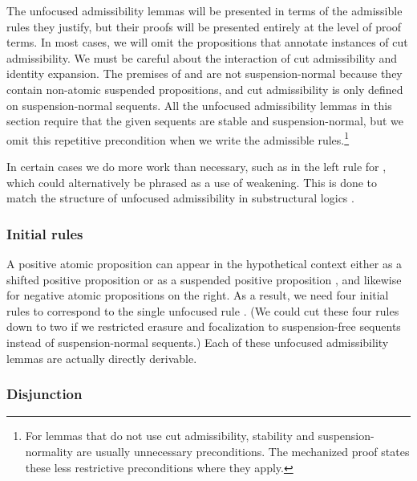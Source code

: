 \documentclass[acmtocl]{robtrans}\pdfoutput=1
\begin{document}
The unfocused admissibility lemmas will be presented in terms of the
admissible rules they justify, but their proofs will be presented
entirely at the level of proof terms. In most cases, we will omit the
propositions that annotate instances of cut admissibility.  We must be
careful about the interaction of cut admissibility and identity
expansion. The premises of  and  are
not suspension-normal because they contain non-atomic suspended
propositions, and cut admissibility is only defined on
suspension-normal sequents. All the unfocused admissibility lemmas in
this section require that the given sequents are stable and
suspension-normal, but we omit this repetitive precondition when we
write the admissible rules.\footnote{For lemmas that do not use cut
  admissibility, stability and suspension-normality are usually
  unnecessary preconditions. The mechanized proof states these less
  restrictive preconditions where they apply.}

\newcommand{\deshift}{\mbox{}}

In certain cases we do more work than necessary, such as in the left
rule for , which could alternatively be phrased as
a use of weakening. This is done to match the structure of unfocused
admissibility in substructural logics \cite{simmons12substructural}.


\subsubsection{Initial rules} 

A positive atomic proposition can appear in the hypothetical context
either as a shifted positive proposition  or as a
suspended positive proposition , and likewise for
negative atomic propositions on the right. As a result, we need four
initial rules to correspond to the single unfocused rule .
(We could cut these four rules down to two if we restricted erasure
and focalization to suspension-free sequents instead of
suspension-normal sequents.)  Each of these unfocused admissibility
lemmas are actually directly derivable.

















\subsubsection{Disjunction}
\end{document}
